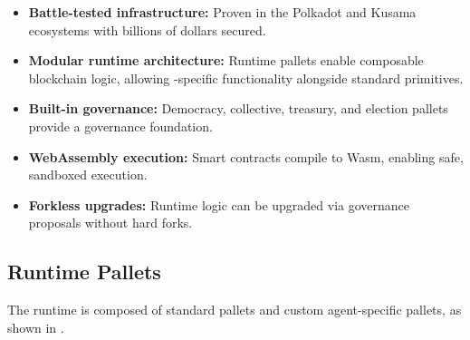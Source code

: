 \begin{itemize}[nosep]
    \item \textbf{Battle-tested infrastructure:} Proven in the Polkadot and Kusama ecosystems with billions of dollars secured.
    \item \textbf{Modular runtime architecture:} Runtime pallets enable composable blockchain logic, allowing \claw{}-specific functionality alongside standard primitives.
    \item \textbf{Built-in governance:} Democracy, collective, treasury, and election pallets provide a governance foundation.
    \item \textbf{WebAssembly execution:} Smart contracts compile to Wasm, enabling safe, sandboxed execution.
    \item \textbf{Forkless upgrades:} Runtime logic can be upgraded via governance proposals without hard forks.
\end{itemize}

\subsection{Runtime Pallets}
\label{sec:pallets}

The \claw{} runtime is composed of standard \substrate{} pallets and custom agent-specific pallets, as shown in .

